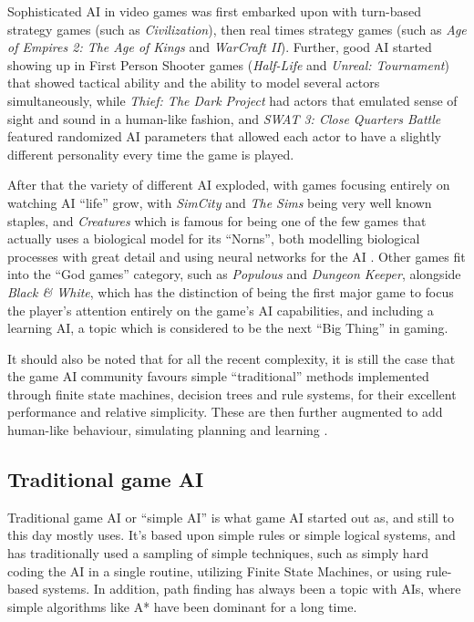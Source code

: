 \documentclass[]{report}
\begin{document}
Sophisticated AI in video games was first embarked upon with turn-based strategy
games (such as \emph{Civilization}), then real times strategy games (such as
\emph{Age of Empires 2: The Age of Kings} and \emph{WarCraft II}). Further, good
AI started showing up in First Person Shooter games (\emph{Half-Life} and
\emph{Unreal: Tournament}) that showed tactical ability and the ability to model
several actors simultaneously, while \emph{Thief: The Dark Project} had actors
that emulated sense of sight and sound in a human-like fashion, and \emph{SWAT
  3: Close Quarters Battle} featured randomized AI parameters that allowed each
actor to have a slightly different personality every time the game is played.

After that the variety of different AI exploded, with games focusing entirely on
watching AI ``life'' grow, with \emph{SimCity} and \emph{The Sims} being very
well known staples, and \emph{Creatures} which is famous for being one of the
few games that actually uses a biological model for its ``Norns'', both
modelling biological processes with great detail and using neural networks for
the AI \citep[see][]{grand1997creatures}. Other games fit into the ``God games''
category, such as \emph{Populous} and \emph{Dungeon Keeper}, alongside
\emph{Black \& White}, which has the distinction of being the first major game
to focus the player's attention entirely on the game's AI capabilities, and
including a learning AI, a topic which is considered to be the next ``Big
Thing'' in gaming.

It should also be noted that for all the recent complexity, it is still the case
that the game AI community favours simple ``traditional'' methods implemented
through finite state machines, decision trees and rule systems, for their
excellent performance and relative simplicity. These are then further augmented
to add human-like behaviour, simulating planning and learning
\citep[see][]{orkin2003applying,isla2002new,khoo2002efficient,mateas2002behavior}.

\subsection{Traditional game AI}
\label{sec:traditional-game-ai}

Traditional game AI or ``simple AI'' is what game AI started out as, and still
to this day mostly uses. It's based upon simple rules or simple logical systems,
and has traditionally used a sampling of simple techniques, such as simply hard
coding the AI in a single routine, utilizing Finite State Machines, or using
rule-based systems. In addition, path finding has always been a topic with AIs,
where simple algorithms like A* have been dominant for a long time.
\end{document}
